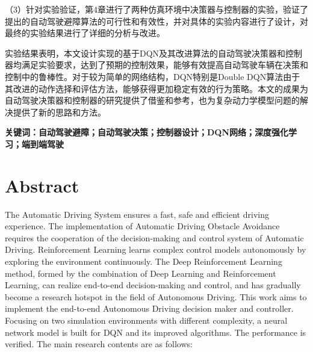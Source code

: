 （3）针对实验验证，第4章进行了两种仿真环境中决策器与控制器的实验，验证了提出的自动驾驶避障算法的可行性和有效性，并对具体的实验内容进行了设计，对最终的实验结果进行了详细的分析与改进。

实验结果表明，本文设计实现的基于DQN及其改进算法的自动驾驶决策器和控制器均满足实验要求，达到了预期的控制效果，能够有效提高自动驾驶车辆在决策和控制中的鲁棒性。对于较为简单的网络结构，DQN特别是Double DQN算法由于其改进的动作选择和评估方法，能够获得更加稳定有效的行为策略。本文的成果为自动驾驶决策器和控制器的研究提供了借鉴和参考，也为复杂动力学模型问题的解决提供了新的思路和方法。

\vspace{4ex}\noindent\textbf{\heiti 关键词：自动驾驶避障；自动驾驶决策；控制器设计；DQN网络；深度强化学习；端到端驾驶}
\newpage

\vspace*{-2mm}

\begin{spacing}{0.95}
  \centering
  \heiti{}\textbf{\thesisTitleEN}
\end{spacing}

\vspace*{17mm}

{\let\clearpage\relax \chapter*{
  \textmd{Abstract}\vskip -3bp}}
\setcounter{page}{2}

\setlength{\parskip}{0em}

The Automatic Driving System ensures a fast, safe and efficient driving experience. The implementation of Automatic Driving Obstacle Avoidance requires the cooperation of the decision-making and control system of Automatic Driving. Reinforcement Learning learns complex control models autonomously by exploring the environment continuously. The Deep Reinforcement Learning method, formed by the combination of Deep Learning and Reinforcement Learning,  can realize end-to-end decision-making and control, and has gradually become a research hotspot in the field of Autonomous Driving. This work aims to implement the end-to-end Autonomous Driving decision maker and controller. Focusing on two simulation environments with different complexity, a neural network model is built for DQN and its improved algorithms. The performance is verified. The main research contents are as follows:

